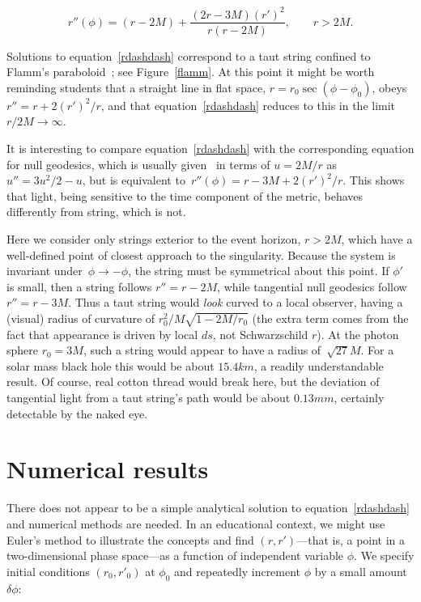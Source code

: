 \documentclass[review]{elsarticle}
\begin{document}
\begin{equation}\label{rdashdash}
  r''\left(\phi\right) =
  (r-2M) + \frac{(2r-3M)\left(r'\right)^2}{r\left(r-2M\right)},\qquad r>2M.
\end{equation}

\noindent Solutions to equation~\ref{rdashdash} correspond to a taut
string confined to Flamm's paraboloid~\cite{flamm1916}; see
Figure~\ref{flamm}.  At this point it might be worth reminding
students that a straight line in flat space,
$r=r_0\sec\left(\phi-\phi_0\right)$, obeys
$r''=r+2\left(r'\right)^2/r$, and that equation~\ref{rdashdash}
reduces to this in the limit $r/2M\longrightarrow\infty$.

It is interesting to compare equation~\ref{rdashdash} with the
corresponding equation for null geodesics, which is usually
given~\cite{wald} in terms of $u=2M/r$ as $u''=3u^2/2-u$, but is
equivalent to~$r''\left(\phi\right)=r-3M+2\left(r'\right)^2/r$.  This
shows that light, being sensitive to the time component of the metric,
behaves differently from string, which is not.


Here we consider only strings exterior to the event horizon, $r>2M$,
which have a well-defined point of closest approach to the
singularity.  Because the system is invariant
under~$\phi\longrightarrow-\phi$, the string must be symmetrical about
this point.  If $\phi'$ is small, then a string follows $r''=r-2M$,
while tangential null geodesics follow $r''=r-3M$.  Thus a taut string
would {\em look} curved to a local observer, having a (visual) radius
of curvature of $r_0^2/M\sqrt{1-2M/r_0}$ (the extra term comes from
the fact that appearance is driven by local $ds$, not Schwarzschild
$r$).  At the photon sphere $r_0=3M$, such a string would appear to
have a radius of~$\sqrt{27}M$.  For a solar mass black hole this would
be about $15.4\unit{km}$, a readily understandable result.  Of course,
real cotton thread would break here, but the deviation of tangential
light from a taut string's path would be about $0.13\unit{mm}$,
certainly detectable by the naked eye.
\section{Numerical results}

There does not appear to be a simple analytical solution to
equation~\ref{rdashdash} and numerical methods are needed.  In an
educational context, we might use Euler's method to illustrate the
concepts and find $\left(r,r'\right)$---that is, a point in a
two-dimensional phase space---as a function of independent variable
$\phi$.  We specify initial conditions $(r_0,r'_0)$ at $\phi_0$ and
repeatedly increment $\phi$ by a small amount $\delta\phi$:
\end{document}
